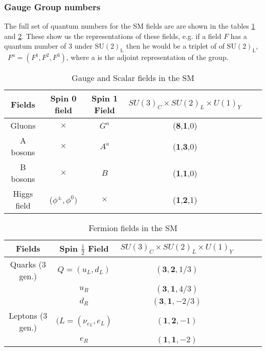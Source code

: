 
\subsubsection{Gauge Group numbers}

The full set of quantum numbers for the SM fields are are shown in the tables \ref{table1} and \ref{table2}. These show us the representations of these fields, e.g. if a field $F$ has a quantum number of 3 under $\mathrm{SU(2)_L}$ then he would be a triplet of of $\mathrm{SU(2)_L}$, \ $F^a = (F^1,F^2,F^3)$, where a is the adjoint representation of the group.   
%
\begin{table}[H]
\centering
\caption{Gauge and Scalar fields in the SM}
\label{table1}
\begin{tabular}{@{}cccccc@{}}
  \hline	
 Fields & Spin 0 field & Spin 1 Field & $SU(3)_C \times SU(2)_L \times U(1)_Y$  \\
  \hline	
 Gluons  & $\times$  & $G^a$ & (\textbf{8},\textbf{1},0) \\	
A bosons & $\times$  & $A^a$ & (\textbf{1},\textbf{3},0)   \\
B bosons & $\times$  & $B$   & (\textbf{1},\textbf{1},0)   \\
Higgs field & ($\phi^\pm, \phi^0 )$  & $\times$ & (\textbf{1},\textbf{2},1) \\ \hline
\end{tabular}
\end{table}
%
\begin{table}[H]
\centering
\caption{Fermion fields in the SM}
\label{table2}
\begin{tabular}{@{}cccccc@{}}
  \hline	
 Fields & Spin $\frac{1}{2}$ Field & $SU(3)_C \times SU(2)_L \times U(1)_Y$  \\
  \hline	
Quarks (3 gen.) & $Q=(u_L,d_L)$ & $(\mathbf{3},\mathbf{2},{1}/{3})$ \\	
$\quad$        & $u_R$ & $(\mathbf{3},\mathbf{1},{4}/{3})$   \\
$\quad$   & $d_R$ & $(\mathbf{3},\mathbf{1}, -{2}/{3})$   \\
Leptons (3 gen.) & $(L=(\nu_{e_L}, e_L )$ & $(\mathbf{1},\mathbf{2},-1)$  \\
$\quad$   & $e_R$ & $(\mathbf{1},\mathbf{1},-2)   $ \\ \hline
%
\end{tabular}
\end{table}
